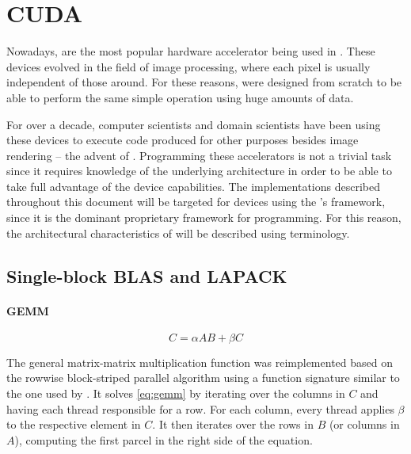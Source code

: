 \documentclass[../thesis]{subfiles}
\begin{document}
	\chapter{CUDA}
	\label{chp:cuda}

	Nowadays, \gpus are the most popular hardware accelerator being used in \hpc. These devices evolved in the field of image processing, where each pixel is usually independent of those around. For these reasons, \gpus were designed from scratch to be able to perform the same simple operation using huge amounts of data.

	For over a decade, computer scientists and domain scientists have been using these devices to execute code produced for other purposes besides image rendering -- the advent of \gpgpus \cite{NVIDIA:GPGPU}. Programming these accelerators is not a trivial task since it requires knowledge of the underlying architecture in order to be able to take full advantage of the device capabilities. The \gpu implementations described throughout this document will be targeted for \nvidia devices using the \nvidia's \cuda framework, since it is the dominant proprietary framework for \gpgpu programming. For this reason, the architectural characteristics of \gpgpus will be described using \cuda terminology.

	
	
	

	\section{Single-block BLAS and LAPACK}
	\label{sec:cuda:blas}
		\subsubsection{GEMM}

		\begin{equation}
			C = \alpha A B + \beta C
			\label{eq:gemm}
		\end{equation}

		The general matrix-matrix multiplication function was reimplemented based on the rowwise block-striped parallel algorithm \cite[277-281]{Quinn:PP:2003} using a function signature similar to the one used by \mkl. It solves \cref{eq:gemm} by iterating over the columns in $C$ and having each thread responsible for a row. For each column, every thread applies $\beta$ to the respective element in $C$. It then iterates over the rows in $B$ (or columns in $A$), computing the first parcel in the right side of the equation.
\end{document}
